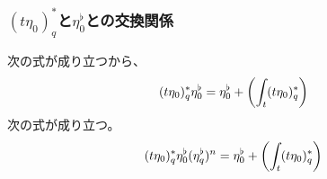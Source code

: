 {\subsubsection{$(t\eta_0)_q^*$と$\eta_0^\flat$との交換関係} %
	次の式が成り立つから、
	\begin{equation*}\begin{split}
		(t\eta_0)_q^*\eta_0^\flat = \eta_0^\flat + \mathinner{\left({\int_t(t\eta_0)_q^*}\right)}
	\end{split}\end{equation*}
	次の式が成り立つ。
	\begin{equation*}\begin{split}
		(t\eta_0)_q^*\eta_0^\flat(\eta_q^\flat)^n 
		= \eta_0^\flat + \mathinner{\left({\int_t(t\eta_0)_q^*}\right)}
	\end{split}\end{equation*}
}
